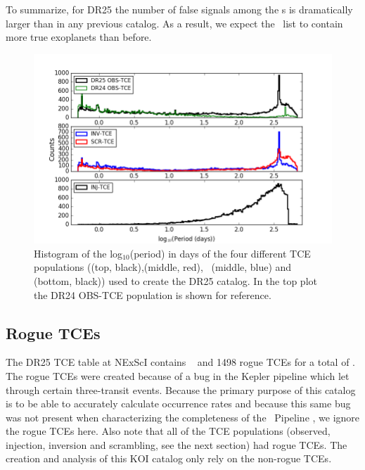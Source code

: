 To summarize, for DR25 the number of false signals among the \opstce s  is dramatically larger than in any previous catalog. As a result, we expect the \opstce\ list to contain more true exoplanets than before.   

\begin{figure}[h!]
 \begin{center}
  \includegraphics[width=1.0\linewidth]{fig-tcePeriods.png}
  \caption{Histogram of the log$_{10}$(period) in days of the four different TCE populations (\opstce (top, black),\scrtce (middle, red), \invtce\ (middle, blue) and \injtce (bottom, black)) used to create the DR25 catalog. In the top plot the DR24 OBS-TCE population is shown for reference.}
  \label{f:tces} 
 \end{center}
 \end{figure}



\subsection{Rogue TCEs}
The DR25 TCE table at NExScI contains \ntcesnorogue\  and 1498 rogue TCEs for a total of \ntces. The rogue TCEs were created because of a bug in the Kepler pipeline which let through certain three-transit events. Because the primary purpose of this catalog is to be able to accurately calculate occurrence rates and because this same bug was not present when characterizing the completeness of the \Kepler\ Pipeline \citep{Christiansen2017,Burke2017a,Burke2017b,Burke2017c}, we ignore the rogue TCEs here. Also note that all of the TCE populations (observed, injection, inversion and scrambling, see the next section) had rogue TCEs. The creation and analysis of this KOI catalog only rely on the non-rogue TCEs.

